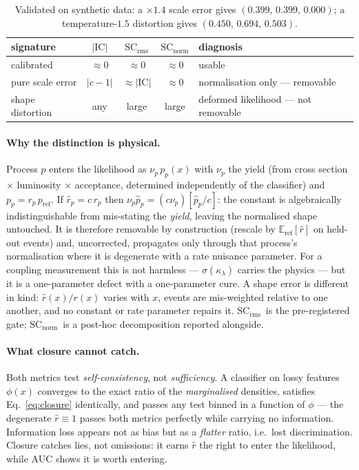 \documentclass[11pt]{article}
\newcommand{\kl}{\ensuremath{\kappa_\lambda}}
\newcommand{\IC}{\ensuremath{\mathrm{IC}}}
\newcommand{\SCr}{\ensuremath{\mathrm{SC_{rms}}}}
\newcommand{\SCn}{\ensuremath{\mathrm{SC_{norm}}}}
\newcommand{\Eref}{\ensuremath{\mathbb{E}_{\mathrm{ref}}}}
\begin{document}
\begin{table}[h]
\centering\small
\begin{tabular}{@{}lcccl@{}}
\toprule
signature & $|\IC|$ & \SCr & \SCn & diagnosis \\
\midrule
calibrated & $\approx 0$ & $\approx 0$ & $\approx 0$ & usable \\
pure scale error & $|c-1|$ & $\approx|\IC|$ & $\approx 0$ & normalisation only --- removable \\
shape distortion & any & large & large & deformed likelihood --- not removable \\
\bottomrule
\end{tabular}
\caption{Validated on synthetic data: a $\times1.4$ scale error gives
$(0.399,\,0.399,\,0.000)$; a temperature-$1.5$ distortion gives $(0.450,\,0.694,\,0.503)$.}
\label{tab:signatures}
\end{table}

\paragraph{Why the distinction is physical.} Process $p$ enters the likelihood as
$\nu_p\,p_p(x)$ with $\nu_p$ the yield (from cross section $\times$ luminosity $\times$
acceptance, determined independently of the classifier) and $p_p = r_p\,p_{\mathrm{ref}}$.
If $\hat r_p = c\,r_p$ then $\nu_p\hat p_p = (c\nu_p)[\hat p_p/c]$: the constant is
algebraically indistinguishable from mis-stating the \emph{yield}, leaving the normalised
shape untouched. It is therefore removable by construction (rescale by $\Eref[\hat r]$ on
held-out events) and, uncorrected, propagates only through that process's normalisation
where it is degenerate with a rate nuisance parameter. For a coupling measurement this is
not harmless --- $\sigma(\kl)$ carries the physics --- but it is a one-parameter defect with
a one-parameter cure. A shape error is different in kind: $\hat r(x)/r(x)$ varies with $x$,
events are mis-weighted relative to one another, and no constant or rate parameter repairs
it. \SCr\ is the pre-registered gate; \SCn\ is a post-hoc decomposition reported alongside.

\paragraph{What closure cannot catch.} Both metrics test \emph{self-consistency}, not
\emph{sufficiency}. A classifier on lossy features $\phi(x)$ converges to the exact ratio of
the \emph{marginalised} densities, satisfies Eq.~\eqref{eq:closure} identically, and passes
any test binned in a function of $\phi$ --- the degenerate $\hat r\equiv 1$ passes both
metrics perfectly while carrying no information. Information loss appears not as bias but as
a \emph{flatter} ratio, i.e.\ lost discrimination. Closure catches lies, not omissions: it
earns $\hat r$ the right to enter the likelihood, while AUC shows it is worth entering.
\end{document}
